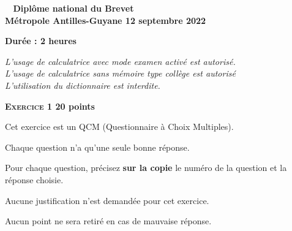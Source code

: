 \documentclass[11pt]{article}
\begin{document}
\label{Metropolesep}

\pagestyle{fancy}
\thispagestyle{empty}
\begin{center}
{\Large\textbf{\decofourleft~ Diplôme national du Brevet
 ~\decofourright}}\\[6pt]
{\Large \textbf{Métropole  Antilles-Guyane 12 septembre 2022}}

\vspace{0,5cm}

\textbf{Durée : 2 heures}
\end{center}
\medskip

\emph{L'usage de calculatrice avec mode examen activé est autorisé.\\
L'usage de calculatrice sans mémoire \og type collège \fg{} est autorisé\\
L'utilisation du dictionnaire est interdite.}

\vspace{0,5cm}
\vspace{0.75cm}

\textbf{{\large \textsc{Exercice 1}} \hfill 20 points}

\medskip

Cet exercice est un QCM (Questionnaire à Choix Multiples).

Chaque question n'a qu'une seule bonne réponse.

Pour chaque question, précisez \textbf{sur la copie} le numéro de la question et la réponse choisie.

Aucune justification n'est demandée pour cet exercice.

Aucun point ne sera retiré en cas de mauvaise réponse.
\end{document}

